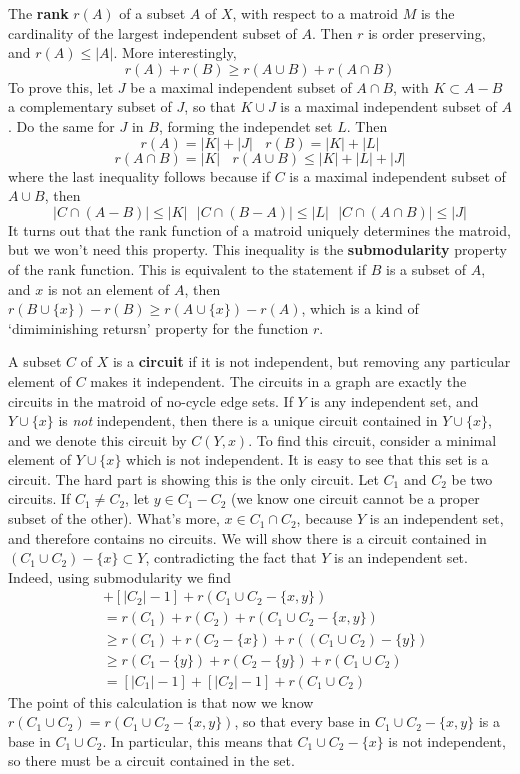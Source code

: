 The {\bf rank} $r(A)$ of a subset $A$ of $X$, with respect to a matroid $M$ is the cardinality of the largest independent subset of $A$. Then $r$ is order preserving, and $r(A) \leq |A|$. More interestingly,
%
\[ r(A) + r(B) \geq r(A \cup B) + r(A \cap B) \]
%
To prove this, let $J$ be a maximal independent subset of $A \cap B$, with $K \subset A - B$ a complementary subset of $J$, so that $K \cup J$ is a maximal independent subset of $A$. Do the same for $J$ in $B$, forming the independet set $L$. Then
%
\[ r(A) = |K| + |J|\ \ \ \ r(B) = |K| + |L| \]
\[ r(A \cap B) = |K|\ \ \ \ r(A \cup B) \leq |K| + |L| + |J| \]
%
where the last inequality follows because if $C$ is a maximal independent subset of $A \cup B$, then
%
\[ |C \cap (A-B)| \leq |K|\ \ \ |C \cap (B-A)| \leq |L|\ \ \ |C \cap (A \cap B)| \leq |J| \]
%
It turns out that the rank function of a matroid uniquely determines the matroid, but we won't need this property. This inequality is the {\bf submodularity} property of the rank function. This is equivalent to the statement if $B$ is a subset of $A$, and $x$ is not an element of $A$, then $r(B \cup \{ x \}) - r(B) \geq r(A \cup \{ x \}) - r(A)$, which is a kind of `dimiminishing retursn' property for the function $r$.

A subset $C$ of $X$ is a {\bf circuit} if it is not independent, but removing any particular element of $C$ makes it independent. The circuits in a graph are exactly the circuits in the matroid of no-cycle edge sets. If $Y$ is any independent set, and $Y \cup \{ x \}$ is {\it not}   independent, then there is a unique circuit contained in $Y \cup \{ x \}$, and we denote this circuit by $C(Y,x)$. To find this circuit, consider a minimal element of $Y \cup \{ x \}$ which is not independent. It is easy to see that this set is a circuit. The hard part is showing this is the only circuit. Let $C_1$ and $C_2$ be two circuits. If $C_1 \neq C_2$, let $y \in C_1 - C_2$ (we know one circuit cannot be a proper subset of the other). What's more, $x \in C_1 \cap C_2$, because $Y$ is an independent set, and therefore contains no circuits. We will show there is a circuit contained in $(C_1 \cup C_2) - \{ x \} \subset Y$, contradicting the fact that $Y$ is an independent set. Indeed, using submodularity we find
%
\begin{align*}
    [|C_1| - 1]& + [|C_2| - 1] + r(C_1 \cup C_2 - \{ x, y \})\\
    &= r(C_1) + r(C_2) + r(C_1 \cup C_2 - \{ x, y \})\\
    &\geq r(C_1) + r(C_2 - \{ x \}) + r((C_1 \cup C_2) - \{ y \} )\\
    &\geq r(C_1 - \{ y \}) + r(C_2 - \{ y \}) + r(C_1 \cup C_2)\\
    &= [|C_1| - 1] + [|C_2| - 1] + r(C_1 \cup C_2)
\end{align*}
%
The point of this calculation is that now we know $r(C_1 \cup C_2) = r(C_1 \cup C_2 - \{ x, y \})$, so that every base in $C_1 \cup C_2 - \{ x, y \}$ is a base in $C_1 \cup C_2$. In particular, this means that $C_1 \cup C_2 - \{ x \}$ is not independent, so there must be a circuit contained in the set.

